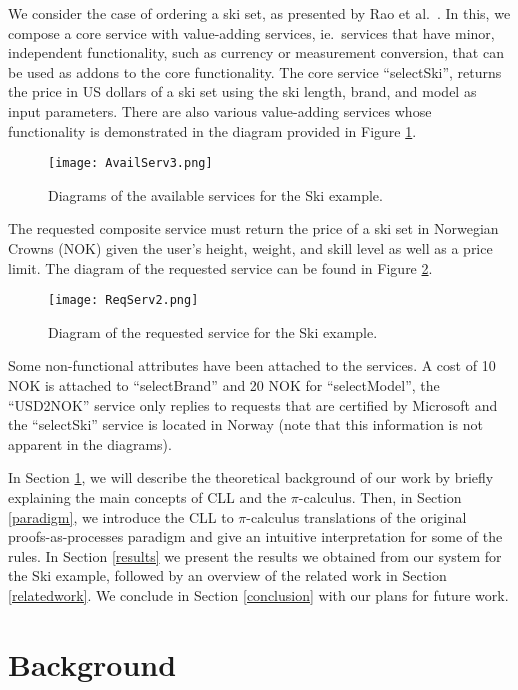 \documentclass[copyright,creativecommons]{eptcs}
\begin{document}
We consider the case of ordering a ski set, as presented by Rao et al.\ \cite{rao2006composition}. In this, we compose a core service with value-adding services, ie.\ services that have minor, independent functionality, such as currency or measurement conversion, that can be used as addons to the core functionality. The core service ``selectSki'', returns the price in US dollars of a ski set using the ski length, brand, and model as input parameters. There are also various value-adding services whose functionality is demonstrated in the diagram provided in Figure \ref{fig:AvailServ}. 
\begin{figure}[htbp]
	\centering
		\texttt{[image: AvailServ3.png]}
	\caption{Diagrams of the available services for the Ski example.}
	\label{fig:AvailServ}
\end{figure}
The requested composite service must return the price of a ski set in Norwegian Crowns (NOK) given the user's height, weight, and skill level as well as a price limit. The diagram of the requested service can be found in Figure \ref{fig:ReqServ}.
\begin{figure}[htbp]
	\centering
		\texttt{[image: ReqServ2.png]}
	\caption{Diagram of the requested service for the Ski example.}
	\label{fig:ReqServ}
\end{figure}
Some non-functional attributes have been attached to the services. A cost of 10 NOK is attached to ``selectBrand'' and 20 NOK for ``selectModel'', the ``USD2NOK'' service only replies to requests that are certified by Microsoft and the ``selectSki'' service is located in Norway (note that this information is not apparent in the diagrams).

In Section \ref{background}, we will describe the theoretical background of our work by briefly explaining the main concepts of CLL and the $\pi$-calculus. Then, in Section \ref{paradigm}, we introduce the CLL to $\pi$-calculus translations of the original proofs-as-processes paradigm and give an intuitive interpretation for some of the rules. In Section \ref{results} we present the results we obtained from our system for the Ski example, followed by an overview of the related work in Section \ref{relatedwork}. We conclude in Section \ref{conclusion} with our plans for future work.

\section{Background}
\label{background}
\end{document}
